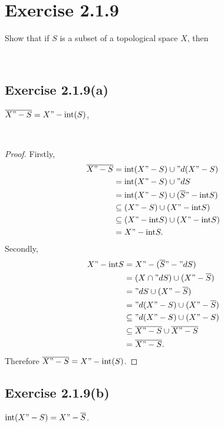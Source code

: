 \documentclass[12pt]{article}
\newenvironment{problem}
    {\begin{lrbox}{\mybox}\begin{minipage}{\textwidth-10pt}}
    {\end{minipage}\end{lrbox}\framebox[6.5in]{\usebox{\mybox}}\\}
\newcommand{\clo}[1]{\overline{#1}}
\renewcommand{\int}{\text{int}}
\begin{document}
\section*{Exercise 2.1.9}
\begin{problem}
    Show that if $S$ is a subset of a topological space $X$, then
\end{problem}

\subsection*{Exercise 2.1.9(a)}
\begin{problem}
    $\clo{X"-S} = X"-\int(S)$,
\end{problem}

\begin{proof}
    Firstly,
    \begin{align*}
        \clo{X"-S} 
            &= \int(X"-S) \cup "d(X"-S) \\
            &= \int(X"-S) \cup "dS \\
            &= \int(X"-S) \cup (\clo{S}"-\int S) \\
            &\subseteq (X"-S) \cup (X"-\int S) \\
            &\subseteq (X"-\int S) \cup (X"-\int S) \\
            &= X"-\int S.
    \end{align*}
    Secondly,
    \begin{align*}
        X"-\int S
            &= X"-(\clo{S}"-"dS)\\
            &= (X\cap"dS) \cup (X"-\clo{S}) \\
            &= "dS \cup (X"-\clo{S}) \\
            &= "d(X"-S) \cup (X"-\clo{S}) \\
            &\subseteq "d(X"-S) \cup (X"-S) \\
            &\subseteq \clo{X"-S} \cup \clo{X"-S} \\
            &= \clo{X"-S}.
    \end{align*}
    Therefore $\clo{X"-S} = X"-\int(S)$.
    
\end{proof}

\subsection*{Exercise 2.1.9(b)}
\begin{problem}
    $\int(X"-S) = X"-\clo{S}$.
\end{problem}
\end{document}
